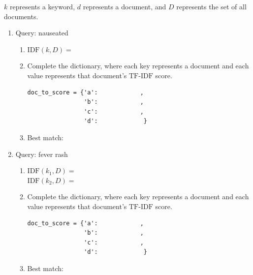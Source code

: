 \documentclass{assignment}
\begin{document}
$k$ represents a keyword, $d$ represents a document, and $D$ represents the set of all documents.

\begin{enumerate}

\item Query: nauseated
\begin{enumerate}
\item $\text{IDF}(k, D) = $\\

\item Complete the  dictionary, where each key represents a document and each value represents that document's $\text{TF-IDF}$ score.
\begin{verbatim}
doc_to_score = {'a':            ,
                'b':            ,
                'c':            ,
                'd':             }
\end{verbatim}
\item Best match:
\end{enumerate}

\item Query: fever rash
\begin{enumerate}
\item $\text{IDF}(k_1, D) = $\\

$\text{IDF}(k_2, D) = $\\


\item Complete the  dictionary, where each key represents a document and each value represents that document's $\text{TF-IDF}$ score.
\begin{verbatim}
doc_to_score = {'a':            ,
                'b':            ,
                'c':            ,
                'd':             }
\end{verbatim}
\item Best match:

\end{enumerate}

\end{enumerate}
\end{document}

